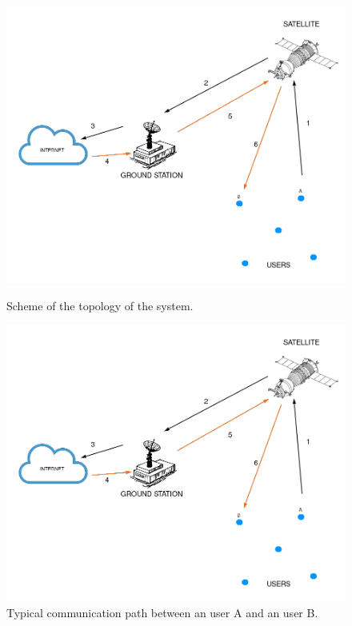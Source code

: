 \begin{figure}
	\centering
	\begin{minipage}{0.45\textwidth}
		\includegraphics[width=\textwidth]{figures/System_topology_noBG.png}
		\caption{Scheme of the topology of the system.}
		\label{fig:topology}
	\end{minipage}\hspace{0.5cm}
	\begin{minipage}{0.45\textwidth}
		\includegraphics[width=\textwidth]{figures/System_topology_noBG.png}
		\caption{Typical communication path between an user A and an user B.}
		\label{fig:communication}
	\end{minipage}
\end{figure}

